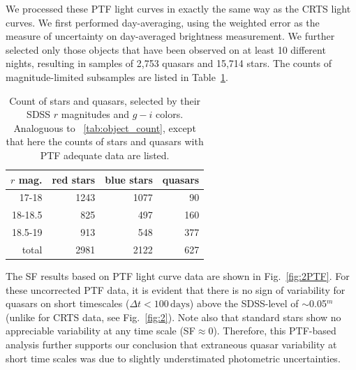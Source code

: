\documentclass[fleqn,usenatbib]{mnras}
\begin{document}
We processed these PTF light curves in exactly the same way as the CRTS light curves. We first performed day-averaging, 
using the weighted error as the measure of uncertainty on day-averaged brightness measurement. We further selected only 
those objects that have been observed on at least 10 different nights, resulting in samples of 2,753 quasars and 15,714 stars. 
The counts of magnitude-limited subsamples are listed in Table~\ref{tab:ptf}. 

\begin{table}
\centering
\caption{Count of stars and quasars, selected by their SDSS $r$ magnitudes and $g-i$ colors. Analoguous to ~\ref{tab:object_count}, except that here the counts of stars and quasars with PTF
adequate data are listed.}
\label{tab:ptf}
\begin{tabular}{ r|rrr } 
\hline
$r$ mag.  & red stars & blue stars & quasars \\ 
\hline
17-18   & 1243 & 1077   & 90    \\ 
18-18.5 & 825 &  497  & 160   \\ 
18.5-19 & 913 &  548  & 377   \\
\hline
total       & 2981 &  2122 & 627  
\end{tabular}
\end{table}
 
The SF results based on PTF light curve data are shown in Fig.~\ref{fig:2PTF}.  For these uncorrected PTF data, 
it is evident that there is no sign of variability for quasars on short timescales ($\Delta t < 100 \, \mathrm{days}$) 
above the SDSS-level of $\sim$0.05$^m$ (unlike for CRTS data, see Fig.~\ref{fig:2}). Note also that standard stars 
show no appreciable variability at any time scale (SF$\approx0$). Therefore, this PTF-based analysis further 
supports our conclusion that extraneous quasar variability at short time scales was due to slightly understimated
photometric uncertainties. 
\end{document}
